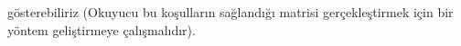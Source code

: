 \documentclass[11pt]{amsbook}
\begin{document}

gösterebiliriz (Okuyucu bu koşulların sağlandığı matrisi gerçekleştirmek için bir yöntem geliştirmeye çalışmalıdır).
\end{document}
